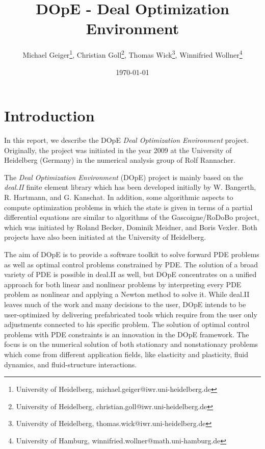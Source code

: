 \documentclass[a4paper,cleardoubleempty]{scrreprt}
\begin{document}
\title{DOpE - Deal Optimization Environment}
\author{
  Michael Geiger\thanks{University of Heidelberg, 
    {michael.geiger@iwr.uni-heidelberg.de}}, 
  Christian Goll\thanks{University of Heidelberg, 
    {christian.goll@iwr.uni-heidelberg.de}}, 
  Thomas Wick\thanks{University of Heidelberg, 
    {thomas.wick@iwr.uni-heidelberg.de}}, 
  Winnifried Wollner\thanks{University of Hamburg, 
    {winnifried.wollner@math.uni-hamburg.de}}
}



\date{\today}

\maketitle
\cleardoublepage\pagestyle{headings}
\tableofcontents
\cleardoublepage

\chapter{Introduction}
In this report, we describe the DOpE
\textit{Deal Optimization Environment} project. 
Originally, the project was initiated in the year 2009 at the 
University of Heidelberg (Germany) in the numerical analysis
group of Rolf Rannacher. 

The \textit{Deal Optimization Environment} (DOpE) project is mainly 
based on the
\textit{deal.II} finite element library which has been developed initially
by W. Bangerth, R. Hartmann, and G. Kanschat. 
In addition, some algorithmic aspects to compute optimization problems
in which the state is given in terms of a partial
differential equations are similar to algorithms of the
Gascoigne/RoDoBo 
project, which was initiated by 
Roland Becker, Dominik Meidner,  and Boris Vexler. 
Both projects have also been 
initiated at the University of Heidelberg. 

The aim of DOpE is to provide a software toolkit to solve forward PDE
problems as well as optimal control problems constrained by PDE. The
solution of a broad variety of PDE is possible in deal.II as well, but
DOpE concentrates on a unified approach for both linear and nonlinear
problems by interpreting every PDE problem as nonlinear and applying a
Newton method to solve it. While deal.II leaves much of the work and many
decisions to the user, DOpE intends to be user-optimized by delivering
prefabricated tools which require from the user only adjustments connected
to his specific problem. The solution of optimal control problems with PDE
constraints is an innovation in the DOpE framework.
The focus is on the numerical solution of both stationary and nonstationary
problems which come from different application fields, like elasticity and
plasticity, fluid dynamics, and fluid-structure interactions.
\end{document}
